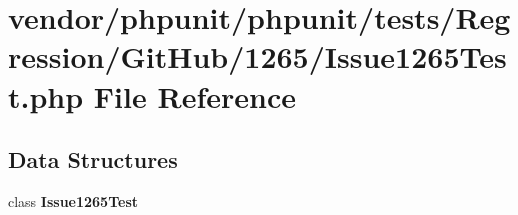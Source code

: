 \section{vendor/phpunit/phpunit/tests/\+Regression/\+Git\+Hub/1265/\+Issue1265\+Test.php File Reference}
\label{_issue1265_test_8php}
\subsection*{Data Structures}
\begin{DoxyCompactItemize}
\item 
class {\bf Issue1265\+Test}
\end{DoxyCompactItemize}
